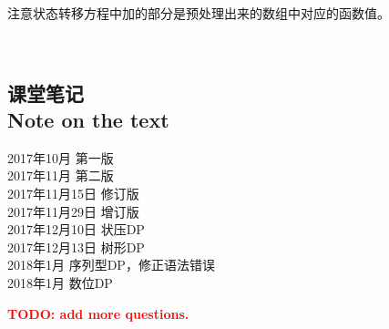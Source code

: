 \documentclass{article}
\theoremstyle{nonumberplain}
\newcommand{\note}{\ \par
	\subsection*{课堂笔记\\\tiny{Note on the text}}
	\newpage}
\begin{document}
注意状态转移方程中加的部分是预处理出来的数组中对应的函数值。

\note
\begin{flushright}
	2017年10月 第一版\\
	2017年11月 第二版\\
	2017年11月15日 修订版\\
	2017年11月29日 增订版\\
	2017年12月10日 状压DP\\
	2017年12月13日 树形DP\\
	2018年1月 序列型DP，修正语法错误\\
	2018年1月 数位DP\\
\end{flushright}
\begin{center}\textcolor{red}{\huge{\textbf{TODO: add more questions.}}}\end{center}
\end{document}
